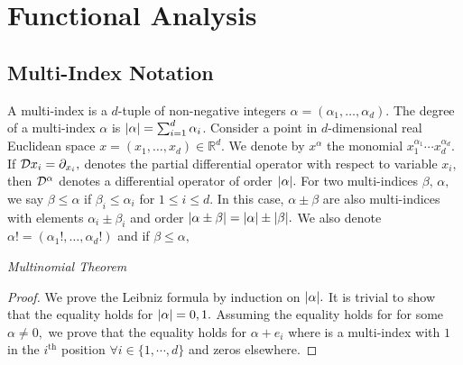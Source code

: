 \chapter{Functional Analysis}

\section{Multi-Index Notation}
A multi-index is a $d$-tuple of non-negative integers $\alpha=(\alpha_1,\dotsc,\alpha_d).$ The degree of a multi-index $\alpha$ is $\abs{\alpha}=\sum_{i=1}^d\alpha_i$. Consider a point in $d$-dimensional real Euclidean space $x=(x_1,\dotsc,x_d)\in\mathbb{R}^d.$ We denote by $x^\alpha$ the monomial $x_1^{\alpha_1}\cdots x_d^{\alpha_d}.$ If $\mathcal{D}{x_i}=\partial_{x_i},$ denotes the partial differential operator with respect to variable $x_i,$ then 
$\mathcal{D}^\alpha$ denotes a differential operator of order $\abs{\alpha}.$
For two multi-indices $\beta,\,\alpha,$ we say $\beta\leq\alpha$ if $\beta_i\leq\alpha_i$ for $1\leq i\leq d.$ In this case, $\alpha\pm\beta$ are also multi-indices with elements $\alpha_i\pm\beta_i$ and order $\abs{\alpha\pm\beta}=\abs{\alpha}\pm\abs{\beta}.$ We also denote $\alpha!=(\alpha_1!,\dotsc,\alpha_d!)$ and if $\beta\leq\alpha,$

\begin{theorem}
    \textit{Multinomial Theorem}
\end{theorem}
\begin{theorem}
\end{theorem}
\begin{proof}
We prove the Leibniz formula by induction on $\abs{\alpha}.$ It is trivial to show that the equality holds for $\abs{\alpha}=0,1.$ Assuming the equality holds for for some $\alpha\neq0,$ we prove that the equality holds for $\alpha+e_i$ where is a multi-index with $1$ in the $i^\mathrm{th}$ position $\forall i\in\{1,\cdots,d\}$ and zeros elsewhere.

    
\end{proof}

